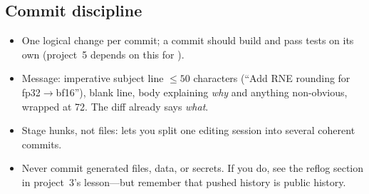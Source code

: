 \subsection{Commit discipline}

\begin{itemize}
  \item One logical change per commit; a commit should build and pass tests on its own (project~5 depends on this for ).
  \item Message: imperative subject line $\le 50$ characters (``Add RNE rounding for fp32$\to$bf16''), blank line, body explaining \emph{why} and anything non-obvious, wrapped at 72. The diff already says \emph{what}.
  \item Stage hunks, not files:  lets you split one editing session into several coherent commits.
  \item Never commit generated files, data, or secrets. If you do, see the reflog section in project~3's lesson---but remember that pushed history is public history.
\end{itemize}
